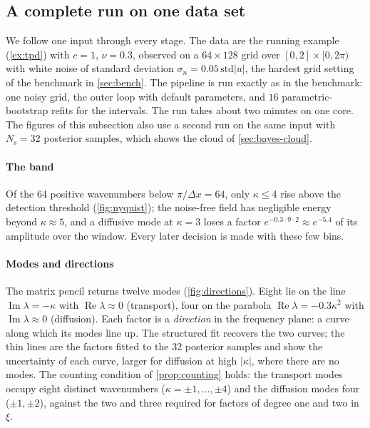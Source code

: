 \documentclass[11pt]{article}
\theoremstyle{plain}
\theoremstyle{definition}
\theoremstyle{remark}
\newcommand{\noise}{\sigma_{n}}             %
\newcommand{\Nsamp}{N_{\mathrm s}}          %
\newcommand{\abs}[1]{\lvert#1\rvert}
\begin{document}
\subsection{A complete run on one data set}\label{sec:worked}
We follow one input through every stage. The data are the running example (\cref{ex:tpd}) with $c=1$,
$\nu=0.3$, observed on a $64\times128$ grid over $[0,2]\times[0,2\pi)$ with white noise of standard deviation
$\noise=0.05\,\mathrm{std}\abs u$, the hardest grid setting of the benchmark in \cref{sec:bench}. The pipeline is
run exactly as in the benchmark: one noisy grid, the outer loop with default parameters, and $16$
parametric-bootstrap refits for the intervals. The run takes about two minutes on one core.
The figures of this subsection also use a second run on the same input with $\Nsamp=32$ posterior samples,
which shows the cloud of \cref{sec:bayes-cloud}.

\paragraph{The band} Of the 64 positive wavenumbers below $\pi/\Delta x=64$, only $\kappa\le4$ rise above the
detection threshold (\cref{fig:nyquist}); the noise-free field has negligible energy beyond $\kappa\approx5$, and
a diffusive mode at $\kappa=3$ loses a factor $e^{-0.3\cdot9\cdot2}\approx e^{-5.4}$ of its amplitude over the
window. Every later decision is made with these few bins.


\paragraph{Modes and directions} The matrix pencil returns twelve modes (\cref{fig:directions}). Eight lie on
the line $\operatorname{Im}\lambda=-\kappa$ with $\operatorname{Re}\lambda\approx0$ (transport), four on the parabola
$\operatorname{Re}\lambda=-0.3\kappa^2$ with $\operatorname{Im}\lambda\approx0$ (diffusion). Each factor is a
\emph{direction} in the frequency plane: a curve along which its modes line up. The structured fit
recovers the two curves; the thin lines are the factors fitted to the 32 posterior samples and show the
uncertainty of each curve, larger for diffusion at high $\abs\kappa$, where there are no modes. The counting
condition of \cref{prop:counting} holds: the transport modes occupy eight distinct wavenumbers
($\kappa=\pm1,\dots,\pm4$) and the diffusion modes four ($\pm1,\pm2$), against the two and three required
for factors of degree one and two in $\xi$.
\end{document}
